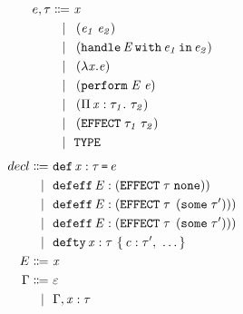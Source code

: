 \begin{multicols}{2}
	\begin{align*}
		e, \tau\Coloneqq&\ \mathit{x}\\
			\lvert\ &\ \left(\mathit{e_1}\;\mathit{e_2}\right)\\
			\lvert\ &\ \left(\texttt{handle}\,\mathit{E}\,\texttt{with}\,\mathit{e_1}\,\texttt{in}\,\mathit{e_2}\right)\\
			\lvert\ &\ \left(\lambda\mathit{x}.\mathit{e}\right)\\
			\lvert\ &\ \left(\texttt{perform}\;\mathit{E}\;\mathit{e}\right)\\
			\lvert\ &\ \left(\Pi\,\mathit{x}:\mathit{\tau_1}.\ \mathit{\tau_2}\right)\\
			\lvert\ &\ \left(\texttt{EFFECT}\;\mathit{\tau_1}\;\mathit{\tau_2}\right)\\
			\lvert\ &\ \texttt{TYPE}\\
	\end{align*}\break
	\begin{align*}
		\DefineTerm{decl}{\StahlDef{x}{\StahlName{\tau}}{\StahlName{e}}}
			\Case{\StahlDefEffNoReturn{E}{\StahlName{\tau}}}
			\Case{\StahlDefEff{E}{\StahlName{\tau}}{\StahlName{\tau'}}}
			\Case{\StahlDefEff{E}{\StahlName{\tau}}{\StahlName{\tau'}}}
			\Case{\StahlDefTy{x}{\StahlName{\tau}}{\StahlCtor{c}{\tau'},\ \ldots}}
		\DefineTerm{E}{\StahlName{x}}
		\DefineTerm{\Gamma}{\varepsilon}
		\Case{\Gamma,\StahlName{x}:\StahlName{\tau}}
	\end{align*}
\end{multicols}
